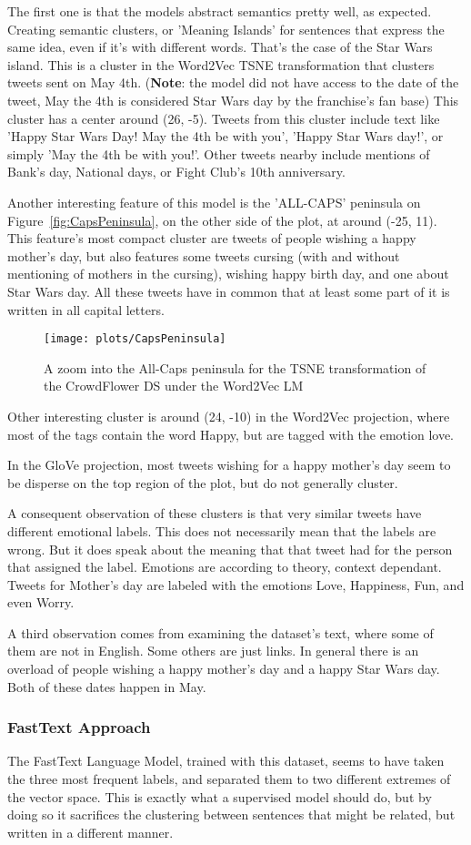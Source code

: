 The first one is that the models abstract semantics pretty well, as expected. Creating semantic clusters, or 'Meaning Islands' for sentences that express the same idea, even if it's with different words. That's the case of the Star Wars island. This is a cluster in the Word2Vec TSNE transformation that clusters tweets sent on May 4th. (\textbf{Note}: the model did not have access to the date of the tweet, May the 4th is considered Star Wars day by the franchise's fan base) This cluster has a center around (26, -5). Tweets from this cluster include text like 'Happy Star Wars Day! May the 4th be with you', 'Happy Star Wars day!', or simply 'May the 4th be with you!'. Other tweets nearby include mentions of Bank's day, National days, or Fight Club's 10th anniversary.

Another interesting feature of this model is the 'ALL-CAPS' peninsula on Figure~\ref{fig:CapsPeninsula}, on the other side of the plot, at around (-25, 11). This feature's most compact cluster are tweets of people wishing a happy mother's day, but also features some tweets cursing (with and without mentioning of mothers in the cursing), wishing happy birth day, and one about Star Wars day. All these tweets have in common that at least some part of it is written in all capital letters.

\begin{figure}[H]
  \texttt{[image: plots/CapsPeninsula]}
  \centering
  \caption{A zoom into the All-Caps peninsula for the TSNE transformation of the CrowdFlower DS under the Word2Vec LM}
\end{figure}\label{fig:CapsPeninsula}

Other interesting cluster is around (24, -10) in the Word2Vec projection, where most of the tags contain the word Happy, but are tagged with the emotion love.

In the GloVe projection, most tweets wishing for a happy mother's day seem to be disperse on the top region of the plot, but do not generally cluster.

A consequent observation of these clusters is that very similar tweets have different emotional labels. This does not necessarily mean that the labels are wrong. But it does speak about the meaning that that tweet had for the person that assigned the label. Emotions are according to theory, context dependant. Tweets for Mother's day are labeled with the emotions Love, Happiness, Fun, and even Worry.

A third observation comes from examining the dataset's text, where some of them are not in English. Some others are just links. In general there is an overload of people wishing a happy mother's day and a happy Star Wars day. Both of these dates happen in May.

\subsubsection{FastText Approach}
The FastText Language Model, trained with this dataset, seems to have taken the three most frequent labels, and separated them to two different extremes of the vector space. This is exactly what a supervised model should do, but by doing so it sacrifices the clustering between sentences that might be related, but written in a different manner.
